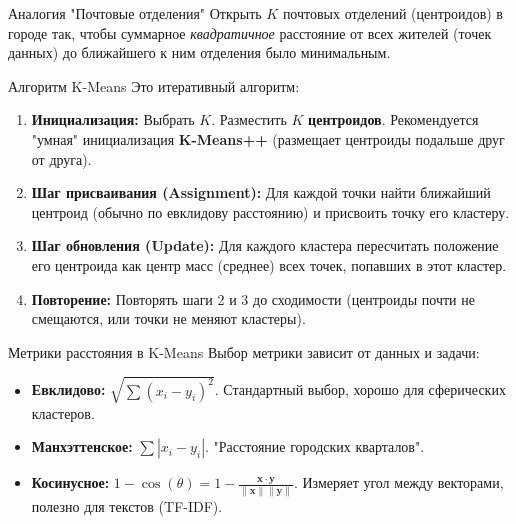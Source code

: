 \begin{myexampleblock}{Аналогия "Почтовые отделения"}
    Открыть $K$ почтовых отделений (центроидов) в городе так, чтобы суммарное \textit{квадратичное} расстояние от всех жителей (точек данных) до ближайшего к ним отделения было минимальным.
\end{myexampleblock}

\begin{textbox}{Алгоритм K-Means}
    Это итеративный алгоритм:
    \begin{enumerate}[nosep, itemsep=0.5ex]
        \item \textbf{Инициализация:} Выбрать $K$. Разместить $K$ \textbf{центроидов}. Рекомендуется "умная" инициализация \textbf{K-Means++} (размещает центроиды подальше друг от друга).
        \item \textbf{Шаг присваивания (Assignment):} Для каждой точки найти ближайший центроид (обычно по евклидову расстоянию) и присвоить точку его кластеру.
        \item \textbf{Шаг обновления (Update):} Для каждого кластера пересчитать положение его центроида как центр масс (среднее) всех точек, попавших в этот кластер.
        \item \textbf{Повторение:} Повторять шаги 2 и 3 до сходимости (центроиды почти не смещаются, или точки не меняют кластеры).
    \end{enumerate}
\end{textbox}

\begin{myblock}{Метрики расстояния в K-Means}
    Выбор метрики зависит от данных и задачи:
    \begin{itemize}[nosep, leftmargin=*]
        \item \textbf{Евклидово:} $\sqrt{\sum(x_i-y_i)^2}$. Стандартный выбор, хорошо для сферических кластеров.
        \item \textbf{Манхэттенское:} $\sum|x_i-y_i|$. "Расстояние городских кварталов".
        \item \textbf{Косинусное:} $1 - \cos(\theta) = 1 - \frac{\mathbf{x} \cdot \mathbf{y}}{\|\mathbf{x}\| \|\mathbf{y}\|}$. Измеряет угол между векторами, полезно для текстов (TF-IDF).
    \end{itemize}
\end{myblock}

